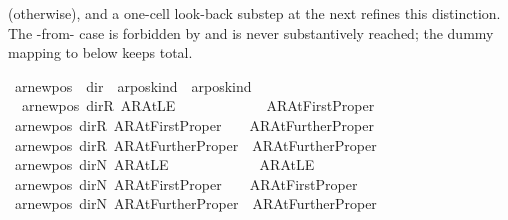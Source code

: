 \begin{isabellebody}
\begin{isamarkuptext}
   (otherwise), and a one-cell
  look-back substep at the next 
  refines this distinction.  The -from-
   case is forbidden by 
  and is never substantively reached; the dummy mapping to
   below keeps 
  total.%
\end{isamarkuptext}\isamarkuptrue%
\isamarkupfalse%
\ ar{\isacharunderscore}{\kern0pt}newpos\ {\isacharcolon}{\kern0pt}{\isacharcolon}{\kern0pt}\ {\isachardoublequoteopen}dir\ {\isasymRightarrow}\ ar{\isacharunderscore}{\kern0pt}pos{\isacharunderscore}{\kern0pt}kind\ {\isasymRightarrow}\ ar{\isacharunderscore}{\kern0pt}pos{\isacharunderscore}{\kern0pt}kind{\isachardoublequoteclose}\ \isanewline
\ \ {\isachardoublequoteopen}ar{\isacharunderscore}{\kern0pt}newpos\ dir{\isachardot}{\kern0pt}R\ AR{\isacharunderscore}{\kern0pt}AtLE\ \ \ \ \ \ \ \ \ \ \ \ {\isacharequal}{\kern0pt}\ AR{\isacharunderscore}{\kern0pt}AtFirstProper{\isachardoublequoteclose}\isanewline
{\isacharbar}{\kern0pt}\ {\isachardoublequoteopen}ar{\isacharunderscore}{\kern0pt}newpos\ dir{\isachardot}{\kern0pt}R\ AR{\isacharunderscore}{\kern0pt}AtFirstProper\ \ \ {\isacharequal}{\kern0pt}\ AR{\isacharunderscore}{\kern0pt}AtFurtherProper{\isachardoublequoteclose}\isanewline
{\isacharbar}{\kern0pt}\ {\isachardoublequoteopen}ar{\isacharunderscore}{\kern0pt}newpos\ dir{\isachardot}{\kern0pt}R\ AR{\isacharunderscore}{\kern0pt}AtFurtherProper\ {\isacharequal}{\kern0pt}\ AR{\isacharunderscore}{\kern0pt}AtFurtherProper{\isachardoublequoteclose}\isanewline
{\isacharbar}{\kern0pt}\ {\isachardoublequoteopen}ar{\isacharunderscore}{\kern0pt}newpos\ dir{\isachardot}{\kern0pt}N\ AR{\isacharunderscore}{\kern0pt}AtLE\ \ \ \ \ \ \ \ \ \ \ \ {\isacharequal}{\kern0pt}\ AR{\isacharunderscore}{\kern0pt}AtLE{\isachardoublequoteclose}\isanewline
{\isacharbar}{\kern0pt}\ {\isachardoublequoteopen}ar{\isacharunderscore}{\kern0pt}newpos\ dir{\isachardot}{\kern0pt}N\ AR{\isacharunderscore}{\kern0pt}AtFirstProper\ \ \ {\isacharequal}{\kern0pt}\ AR{\isacharunderscore}{\kern0pt}AtFirstProper{\isachardoublequoteclose}\isanewline
{\isacharbar}{\kern0pt}\ {\isachardoublequoteopen}ar{\isacharunderscore}{\kern0pt}newpos\ dir{\isachardot}{\kern0pt}N\ AR{\isacharunderscore}{\kern0pt}AtFurtherProper\ {\isacharequal}{\kern0pt}\ AR{\isacharunderscore}{\kern0pt}AtFurtherProper{\isachardoublequoteclose}\isanewline

\end{isabellebody}
